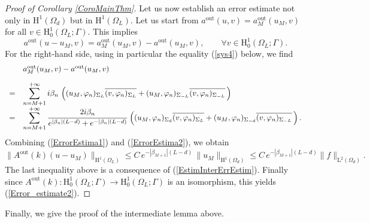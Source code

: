 \documentclass[11pt,a4paper]{report}
\newcommand{\dsp}{\displaystyle}
\newcommand{\Om}{\Omega}
\newcommand{\mrm}[1]{\mathrm{#1}}
\newcommand{\mH}{\mrm{H}}
\begin{document}
\begin{proof}[Proof of Corollary \ref{CoroMainThm}]
Let us now establish an error estimate not only in $\mH^1(\Om_d)$ but in $\mH^1(\Om_L)$. Let us start from $a^{\mrm{out}}(u,v)=a^{\mrm{out}}_M(u_M,v)$ for all $v\in\mH^1_0(\Om_L;\Gamma)$. This implies 
\begin{equation}\label{ErrorEstima1}
a^{\mrm{out}}(u-u_M,v)=a^{\mrm{out}}_M(u_M,v)-a^{\mrm{out}}(u_M,v),\qquad\forall v\in \mH^1_0(\Om_L;\Gamma).
\end{equation}
For the right-hand side, using in particular the equality (\ref{sys4}) below, we find 
\begin{equation}\label{ErrorEstima2}
\begin{array}{ll}
&a^{\mrm{out}}_M(u_M,v)-a^{\mrm{out}}(u_M,v)\\[10pt]
=&\dsp\sum_{n=M+1}^{+\infty}i\beta_n\,\left((u_M,\varphi_n)_{\Sigma_{L}}\overline{(v,\varphi_n)_{\Sigma_{L}}}+(u_M,\varphi_n)_{\Sigma_{-L}}\overline{(v,\varphi_n)_{\Sigma_{-L}}}\,\right)\\[10pt]
=&\dsp\sum_{n=M+1}^{+\infty}\cfrac{2i\beta_n}{e^{|\beta_n|(L-d)}+e^{-|\beta_n|(L-d)}}\,\left((u_M,\varphi_n)_{\Sigma_{d}}\overline{(v,\varphi_n)_{\Sigma_{L}}}+(u_M,\varphi_n)_{\Sigma_{-d}}\overline{(v,\varphi_n)_{\Sigma_{-L}}}\,\right).
\end{array}
\end{equation}
Combining (\ref{ErrorEstima1}) and (\ref{ErrorEstima2}), we obtain
\[
\|A^{\mrm{out}}(k)(u-u_M)\|_{\mH^1(\Om_L)} \le C\,e^{-|\beta_{M+1}|(L-d)}\,\|u_M\|_{\mH^1(\Om_d)}\le C\,e^{-|\beta_{M+1}|(L-d)}\|f\|_{\mrm{L}^2(\Om_d)}. 
\]
The last inequality above is a consequence of (\ref{EstimInterErrEstim}). Finally since $A^{\mrm{out}}(k):\mH^1_0(\Om_L;\Gamma)\to\mH^1_0(\Om_L;\Gamma)$ is an isomorphism, this yields (\ref{Error_estimate2}).
\end{proof}
\noindent Finally, we give the proof of the intermediate lemma above.
\end{document}
